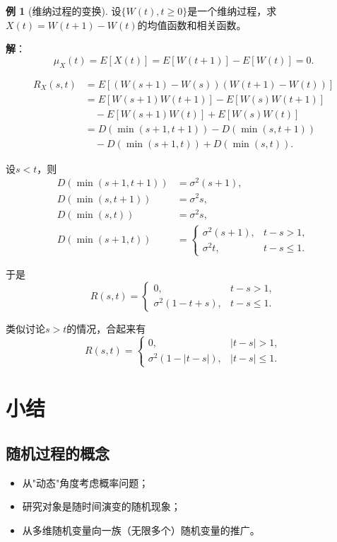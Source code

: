 \documentclass[11pt,a4paper]{report}
\theoremstyle{definition}
\newtheorem{example}{例}[chapter]
\begin{document}
\begin{example}[维纳过程的变换]
设$\{W(t),t\geq0\}$是一个维纳过程，求$X(t)=W(t+1)-W(t)$的均值函数和相关函数。

\textbf{解}：
\[
\mu_X(t)=E[X(t)]=E[W(t+1)]-E[W(t)]=0.
\]

\begin{align*}
R_X(s,t)&=E[(W(s+1)-W(s))(W(t+1)-W(t))]\\
&=E[W(s+1)W(t+1)]-E[W(s)W(t+1)]\\
&\quad-E[W(s+1)W(t)]+E[W(s)W(t)]\\
&=D(\min(s+1,t+1))-D(\min(s,t+1))\\
&\quad-D(\min(s+1,t))+D(\min(s,t)).
\end{align*}

设$s<t$，则
\begin{align*}
D(\min(s+1,t+1))&=\sigma^2(s+1),\\
D(\min(s,t+1))&=\sigma^2s,\\
D(\min(s,t))&=\sigma^2s,\\
D(\min(s+1,t))&=
\begin{cases}
\sigma^2(s+1), & t-s>1,\\
\sigma^2t, & t-s\leq1.
\end{cases}
\end{align*}

于是
\[
R(s,t)=
\begin{cases}
0, & t-s>1,\\
\sigma^2(1-t+s), & t-s\leq1.
\end{cases}
\]

类似讨论$s>t$的情况，合起来有
\[
R(s,t)=
\begin{cases}
0, & |t-s|>1,\\
\sigma^2(1-|t-s|), & |t-s|\leq1.
\end{cases}
\]
\end{example}

\section*{小结}

\subsection*{随机过程的概念}

\begin{itemize}[leftmargin=2em]
    \item 从"动态"角度考虑概率问题；
    \item 研究对象是随时间演变的随机现象；
    \item 从多维随机变量向一族（无限多个）随机变量的推广。
\end{itemize}
\end{document}

